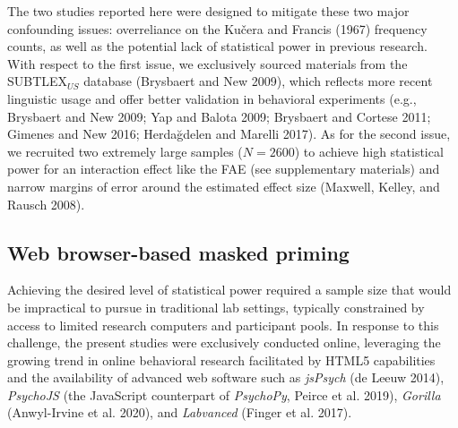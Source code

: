 \documentclass[
]{interact}
\begin{document}
The two studies reported here were designed to mitigate these two major
confounding issues: overreliance on the Kučera and Francis (1967)
frequency counts, as well as the potential lack of statistical power in
previous research. With respect to the first issue, we exclusively
sourced materials from the SUBTLEX\(_{US}\) database (Brysbaert and New
2009), which reflects more recent linguistic usage and offer better
validation in behavioral experiments (e.g., Brysbaert and New 2009; Yap
and Balota 2009; Brysbaert and Cortese 2011; Gimenes and New 2016;
Herdağdelen and Marelli 2017). As for the second issue, we recruited two
extremely large samples (\(N=2600\)) to achieve high statistical power
for an interaction effect like the FAE (see supplementary materials) and
narrow margins of error around the estimated effect size (Maxwell,
Kelley, and Rausch 2008).

\subsection{Web browser-based masked
priming}\label{web-browser-based-masked-priming}

Achieving the desired level of statistical power required a sample size
that would be impractical to pursue in traditional lab settings,
typically constrained by access to limited research computers and
participant pools. In response to this challenge, the present studies
were exclusively conducted online, leveraging the growing trend in
online behavioral research facilitated by HTML5 capabilities and the
availability of advanced web software such as \emph{jsPsych} (de Leeuw
2014), \emph{PsychoJS} (the JavaScript counterpart of \emph{PsychoPy},
Peirce et al. 2019), \emph{Gorilla} (Anwyl-Irvine et al. 2020), and
\emph{Labvanced} (Finger et al. 2017).
\end{document}
